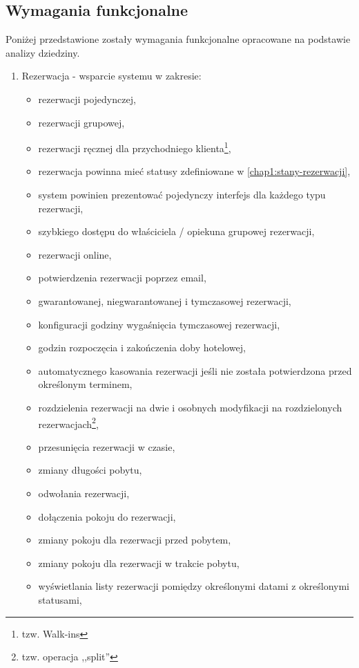 \documentclass[a4paper,onecolumn,oneside,11pt,wide,floatssmall]{mwrep}
\theoremstyle{definition}
\theoremstyle{plain}%
\theoremstyle{remark}
\begin{document}
\subsection{Wymagania funkcjonalne}
Poniżej przedstawione zostały wymagania funkcjonalne opracowane na podstawie analizy dziedziny.

\begin{enumerate}
  \item Rezerwacja - wsparcie systemu w zakresie:
    \begin{itemize}
      \item rezerwacji pojedynczej,
      \item rezerwacji grupowej,
      \item rezerwacji ręcznej dla przychodniego klienta\footnote{tzw. Walk-ins},
      \item rezerwacja powinna mieć statusy zdefiniowane w \ref{chap1:stany-rezerwacji},
      \item system powinien prezentować pojedynczy interfejs dla każdego typu rezerwacji,
      \item szybkiego dostępu do właściciela / opiekuna grupowej rezerwacji,
      \item rezerwacji online,
      \item potwierdzenia rezerwacji poprzez email,
      \item gwarantowanej, niegwarantowanej i tymczasowej rezerwacji,
      \item konfiguracji godziny wygaśnięcia tymczasowej rezerwacji,
      \item godzin rozpoczęcia i zakończenia doby hotelowej,
      \item automatycznego kasowania rezerwacji jeśli nie została potwierdzona przed określonym terminem,
      \item rozdzielenia rezerwacji na dwie i osobnych modyfikacji na rozdzielonych rezerwacjach\footnote{tzw. operacja ,,split''},
      \item przesunięcia rezerwacji w czasie,
      \item zmiany długości pobytu,
      \item odwołania rezerwacji,
      \item dołączenia pokoju do rezerwacji,
      \item zmiany pokoju dla rezerwacji przed pobytem,
      \item zmiany pokoju dla rezerwacji w trakcie pobytu,
      \item wyświetlania listy rezerwacji pomiędzy określonymi datami z określonymi statusami,

\end{itemize}
\end{enumerate}
\end{document}
